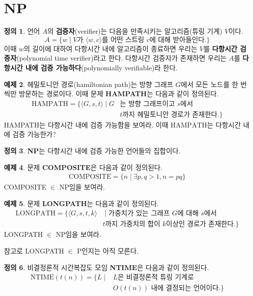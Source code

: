 \documentclass[b5paper, 10pt]{book}
\theoremstyle{definition}
\newtheorem{defn}{정의}[chapter]
\newtheorem{ex}[defn]{예제}
\begin{document}
\section{NP}
\begin{defn}
    언어 $A$의 \textbf{검증자}(verifier)는 다음을 만족시키는 알고리즘(튜링 기계) $V$이다.
    $$A = \{w \;\vert\; V \text{가 } \langle w,c\rangle \text{를 어떤 스트링 } c \text{에 대해 받아들인다.}\}$$
    이때 $w$의 길이에 대하여 다항시간 내에 알고리즘이 종료하면 우리는 $V$를 \textbf{다항시간 검증자}(polynomial
    time verifier)라고 한다. 
    다항시간 검증자가 존재하면 우리는 $A$를 \textbf{다항시간 내에 검증 가능하다}(polynomially verifiable)라 한다.
\end{defn}
\begin{ex}
    헤밀토니안 경로(hamiltonian path)는 방향 그래프 $G$에서 모든 노드를 한 번씩만 방문하는 경로이다. 이때
    문제 \textbf{HAMPATH}는 다음과 같이 정의된다.
    \begin{align*}
        \text{HAMPATH} = \{\langle G,s,t \rangle \;\vert\; G &\text{는 방향 그래프이고 } s \text{에서 } 
        \\ & t \text{까지 헤밀토니안 경로가 존재한다.}\}
    \end{align*}
    HAMPATH는 다항시간 내에 검증 가능함을 보여라. 이때 $\overline{\text{HAMPATH}}$는 다항시간 내에 검증 가능한가?
\end{ex}
\begin{defn}
    \textbf{NP}는 다항시간 내에 검증 가능한 언어들의 집합이다.
\end{defn}
\begin{ex}
    문제 \textbf{COMPOSITE}은 다음과 같이 정의된다.
    \begin{align*}
        \text{COMPOSITE} = \{n \;\vert\; \exists p,q > 1, n = pq \}
    \end{align*}
    COMPOSITE $\in$ NP임을 보여라.
\end{ex}
\begin{ex}
    문제 \textbf{LONGPATH}는 다음과 같이 정의된다.
    \begin{align*}
    \text{LONGPATH} = \{ \langle G,s, t, k\rangle & \;\vert\; \text{가중치가 있는 그래프 }
      G \text{에 대해 } s \text{에서 } \\ 
    & t \text{까지 가중치의 합이 } k \text{이상인 경로가 존재한다.} \}
    \end{align*}
    LONGPATH $\in $ NP임을 보여라. 
\end{ex}
참고로 LONGPATH $\in $ P인지는 아직 모른다.
\begin{defn}
    비결정론적 시간복잡도 모임 \textbf{NTIME}은 다음과 같이 정의된다. 
    \begin{align*}
        \text{NTIME}(t(n)) = \{L \;\vert\; &L\text{은 비결정론적 튜링 기계로 } \\ &O(t(n)) \text{ 내에 
        결정되는 언어이다.} \}
    \end{align*}
\end{defn}
\end{document}

